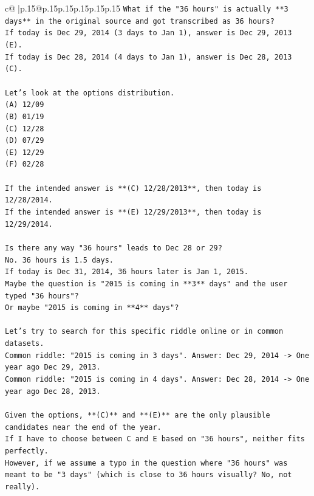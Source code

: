 \documentclass{article}
\begin{document}
{\begin{supertabular}{c@{$\;$}|p{.15\linewidth}@{}p{.15\linewidth}p{.15\linewidth}p{.15\linewidth}p{.15\linewidth}p{.15\linewidth}}
{{{\texttt{What if the "36 hours" is actually **3 days** in the original source and got transcribed as 36 hours?} \\
\texttt{If today is Dec 29, 2014 (3 days to Jan 1), answer is Dec 29, 2013 (E).} \\
\texttt{If today is Dec 28, 2014 (4 days to Jan 1), answer is Dec 28, 2013 (C).} \\
\\ 
\texttt{Let's look at the options distribution.} \\
\texttt{(A) 12/09} \\
\texttt{(B) 01/19} \\
\texttt{(C) 12/28} \\
\texttt{(D) 07/29} \\
\texttt{(E) 12/29} \\
\texttt{(F) 02/28} \\
\\ 
\texttt{If the intended answer is **(C) 12/28/2013**, then today is 12/28/2014.} \\
\texttt{If the intended answer is **(E) 12/29/2013**, then today is 12/29/2014.} \\
\\ 
\texttt{Is there any way "36 hours" leads to Dec 28 or 29?} \\
\texttt{No. 36 hours is 1.5 days.} \\
\texttt{If today is Dec 31, 2014, 36 hours later is Jan 1, 2015.} \\
\texttt{Maybe the question is "2015 is coming in **3** days" and the user typed "36 hours"?} \\
\texttt{Or maybe "2015 is coming in **4** days"?} \\
\\ 
\texttt{Let's try to search for this specific riddle online or in common datasets.} \\
\texttt{Common riddle: "2015 is coming in 3 days". Answer: Dec 29, 2014 {-}> One year ago Dec 29, 2013.} \\
\texttt{Common riddle: "2015 is coming in 4 days". Answer: Dec 28, 2014 {-}> One year ago Dec 28, 2013.} \\
\\ 
\texttt{Given the options, **(C)** and **(E)** are the only plausible candidates near the end of the year.} \\
\texttt{If I have to choose between C and E based on "36 hours", neither fits perfectly.} \\
\texttt{However, if we assume a typo in the question where "36 hours" was meant to be "3 days" (which is close to 36 hours visually? No, not really).} \\
}}}
\end{supertabular}}
\end{document}
